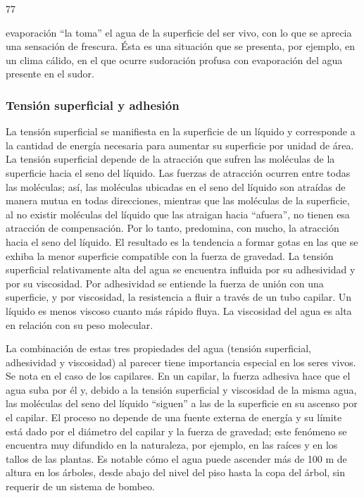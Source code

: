 77

evaporación “la toma” el agua de la superficie del ser vivo, con lo que se aprecia una
sensación de frescura. Ésta es una situación que se presenta, por ejemplo, en un clima
cálido, en el que ocurre sudoración profusa con evaporación del agua presente en el
sudor.

\subsubsection{Tensión superficial y adhesión}

La tensión superficial se manifiesta en la superficie de un líquido y corresponde a la
cantidad de energía necesaria para aumentar su superficie por unidad de área. La tensión
superficial depende de la atracción que sufren las moléculas de la superficie hacia el seno
del líquido. Las fuerzas de atracción ocurren entre todas las moléculas; así, las moléculas
ubicadas en el seno del líquido son atraídas de manera mutua en todas direcciones,
mientras que las moléculas de la superficie, al no existir moléculas del líquido que las
atraigan hacia “afuera”, no tienen esa atracción de compensación. Por lo tanto,
predomina, con mucho, la atracción hacia el seno del líquido. El resultado es la tendencia
a formar gotas en las que se exhiba la menor superficie compatible con la fuerza de
gravedad. La tensión superficial relativamente alta del agua se encuentra influida por su
adhesividad y por su viscosidad. Por adhesividad se entiende la fuerza de unión con una
superficie, y por viscosidad, la resistencia a fluir a través de un tubo capilar. Un líquido
es menos viscoso cuanto más rápido fluya. La viscosidad del agua es alta en relación con
su peso molecular.


La combinación de estas tres propiedades del agua (tensión superficial, adhesividad y
viscosidad) al parecer tiene importancia especial en los seres vivos. Se nota en el caso de
los capilares. En un capilar, la fuerza adhesiva hace que el agua suba por él y, debido a la
tensión superficial y viscosidad de la misma agua, las moléculas del seno del líquido
“siguen” a las de la superficie en su ascenso por el capilar. El proceso no depende de una
fuente externa de energía y su límite está dado por el diámetro del capilar y la fuerza de
gravedad; este fenómeno se encuentra muy difundido en la naturaleza, por ejemplo, en
las raíces y en los tallos de las plantas. Es notable cómo el agua puede ascender más de
100 m de altura en los árboles, desde abajo del nivel del piso hasta la copa del árbol, sin
requerir de un sistema de bombeo.


